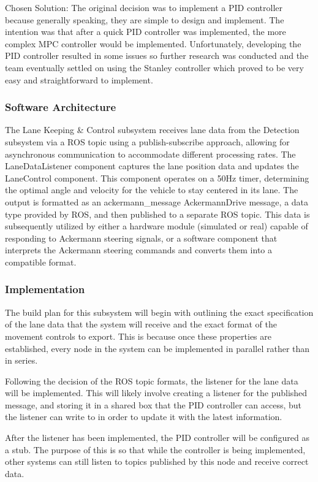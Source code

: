 \documentclass[titlepage]{article}
\begin{document}
Chosen Solution:
The original decision was to implement a PID controller because generally speaking, they are simple to design and implement. The intention was that after a quick PID controller was implemented, the more complex MPC controller would be implemented. Unfortunately, developing the PID controller resulted in some issues so further research was conducted and the team eventually settled on using the Stanley controller which proved to be very easy and straightforward to implement.

\subsubsection{Software Architecture}
The Lane Keeping \& Control subsystem receives lane data from the Detection subsystem via a ROS topic using a publish-subscribe approach, allowing for asynchronous communication to accommodate different processing rates. The LaneDataListener component captures the lane position data and updates the LaneControl component. This component operates on a 50Hz timer, determining the optimal angle and velocity for the vehicle to stay centered in its lane. The output is formatted as an
ackermann\_message
\/
AckermannDrive message,
a data type provided by ROS, and then published to a separate ROS topic. This data is subsequently utilized by either a hardware module (simulated or real) capable of responding to Ackermann steering signals, or a software component that interprets the Ackermann steering commands and converts them into a compatible format.

\subsubsection{Implementation}
The build plan for this subsystem will begin with outlining the exact specification of the lane data that the system will receive and the exact format of the movement controls to export. This is because once these properties are established, every node in the system can be implemented in parallel rather than in series.

Following the decision of the ROS topic formats,  the listener for the lane data will be implemented. This will likely involve creating a listener for the published message, and storing it in a shared box that the PID controller can access, but the listener can write to in order to update it with the latest information.

After the listener has been implemented, the PID controller will be configured as a stub. The purpose of this is so that while the controller is being implemented, other systems can still listen to topics published by this node and receive correct data.
\end{document}
